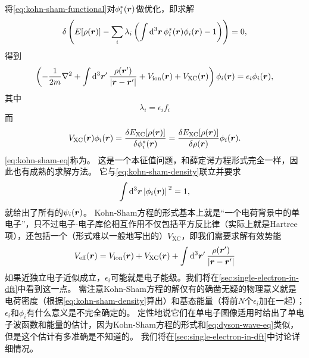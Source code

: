 将\eqref{eq:kohn-sham-functional}对$\phi_i^*(\vb*{r})$做优化，即求解
\begin{equation}
    \var \left( E[\rho(\vb*{r})] - \sum_i \lambda_i \left( \int \dd[3]{\vb*{r}} \phi_i^*(\vb*{r}) \phi_i(\vb*{r}) - 1 \right) \right) = 0,
    \label{eq:dft-variation-principle-shem}
\end{equation}
得到
\begin{equation}
    \left( - \frac{1}{2 m} \laplacian + \int \dd[3]{\vb*{r}'} \frac{\rho(\vb*{r}')}{\abs{\vb*{r} - \vb*{r}'}} + V_\text{ion}(\vb*{r}) + V_\text{XC}(\vb*{r}) \right) \phi_i(\vb*{r}) = \epsilon_i \phi_i(\vb*{r}),
    \label{eq:kohn-sham-eq}
\end{equation}
其中
\begin{equation}
    \lambda_i = \epsilon_i f_i
\end{equation}
而
\begin{equation}
    V_\text{XC}(\vb*{r}) \phi_i(\vb*{r}) = \fdv{E_\text{XC}[\rho(\vb*{r})]}{\phi^*_i(\vb*{r})} = \fdv{E_\text{XC}[\rho(\vb*{r})]}{\rho(\vb*{r})} \phi_i(\vb*{r}).
\end{equation}
\eqref{eq:kohn-sham-eq}称为。
这是一个本征值问题，和薛定谔方程形式完全一样，因此也有成熟的求解方法。
它与\eqref{eq:kohn-sham-density}联立并要求
\begin{equation}
    \int \dd[3]{\vb*{r}} \abs*{\phi_i(\vb*{r})}^2 = 1,
\end{equation}
就给出了所有的$\psi_i(\vb*{r})$。
Kohn-Sham方程的形式基本上就是“一个电荷背景中的单电子”，只不过电子-电子库伦相互作用不仅包括平方反比律（实际上就是Hartree项），还包括一个（形式难以一般地写出的）$V_\text{XC}$，即我们需要求解有效势能
\begin{equation}
    V_\text{eff}(\vb*{r}) = V_\text{ion}(\vb*{r}) + V_\text{XC}(\vb*{r}) + \int \dd[3]{\vb*{r}'} \frac{\rho(\vb*{r}')}{\abs{\vb*{r} - \vb*{r}'}}
\end{equation}
如果近独立电子近似成立，$\epsilon_i$可能就是电子能级。我们将在\autoref{sec:single-electron-in-dft}中看到这一点。
需注意Kohn-Sham方程的解仅有的确凿无疑的物理意义就是电荷密度（根据\eqref{eq:kohn-sham-density}算出）和基态能量（将前$N$个$\epsilon_i$加在一起）；$\epsilon_i$和$\phi_i$有什么意义是不完全确定的。
定性地说它们在单电子图像适用时给出了单电子波函数和能量的估计，因为Kohn-Sham方程的形式和\eqref{eq:dyson-wave-eq}类似，但是这个估计有多准确是不知道的。
我们将在\autoref{sec:single-electron-in-dft}中讨论详细情况。

